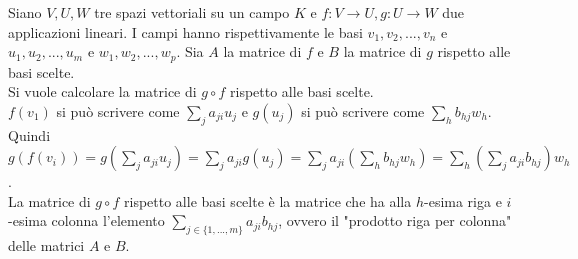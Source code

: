 \documentclass[a4paper]{article}
\theoremstyle{definition}
\begin{document}
Siano $V, U, W$ tre spazi vettoriali su un campo $K$ e $f: V \rightarrow U, g: U \rightarrow W$ due applicazioni lineari.
I campi hanno rispettivamente le basi $v_1, v_2, ..., v_n$ e $u_1, u_2, ..., u_m$ e $w_1, w_2, ..., w_p$.
Sia $A$ la matrice di $f$ e $B$ la matrice di $g$ rispetto alle basi scelte. \\
Si vuole calcolare la matrice di $g \circ f$ rispetto alle basi scelte. \\
$f(v_1)$ si può scrivere come $\sum_{j} a_{ji}u_j$ e $g(u_j)$ si può scrivere come $\sum_{h} b_{hj}w_h$. \\
Quindi $g(f(v_i)) = g\left(\sum_{j} a_{ji}u_j\right) = \sum_{j} a_{ji}g(u_j) = \sum_{j} a_{ji}\left(\sum_{h} b_{hj}w_h\right) = \sum_{h} \left(\sum_{j} a_{ji}b_{hj}\right)w_h$. \\
La matrice di $g \circ f$ rispetto alle basi scelte è la matrice che ha alla $h$-esima riga e $i$-esima colonna l'elemento $\sum_{j\in\{1,...,m\}} a_{ji}b_{hj}$, ovvero il "prodotto riga per colonna" delle matrici $A$ e $B$.
\end{document}
